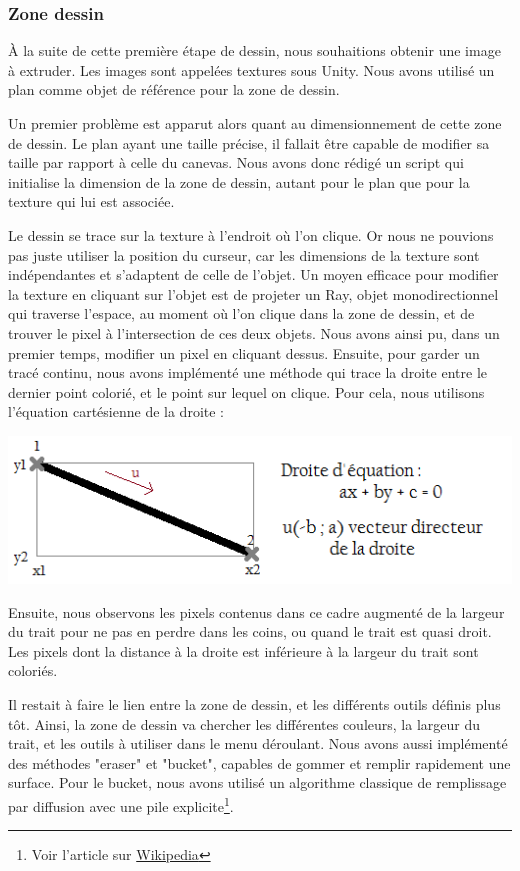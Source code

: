 \documentclass[a4paper,11pt]{article}
\begin{document}
			\subsubsection{Zone dessin} %
			À la suite de cette première étape de dessin, nous souhaitions obtenir une image à extruder. Les images sont appelées textures sous Unity. Nous avons utilisé un plan comme objet de référence pour la zone de dessin.
			
			Un premier problème est apparut alors quant au dimensionnement de cette zone de dessin. Le plan ayant une taille précise, il fallait être capable de modifier sa taille par rapport à celle du canevas. Nous avons donc rédigé un script qui initialise la dimension de la zone de dessin, autant pour le plan que pour la texture qui lui est associée.
			
			Le dessin se trace sur la texture à l'endroit où l'on clique. Or nous ne pouvions pas juste utiliser la position du curseur, car les dimensions de la texture sont indépendantes et s'adaptent de celle de l'objet. Un moyen efficace pour modifier la texture en cliquant sur l'objet est de projeter un Ray, objet monodirectionnel qui traverse l'espace, au moment où l'on clique dans la zone de dessin, et de trouver le pixel à l'intersection de ces deux objets. Nous avons ainsi pu, dans un premier temps, modifier un pixel en cliquant dessus. Ensuite, pour garder un tracé continu, nous avons implémenté une méthode qui trace la droite entre le dernier point colorié, et le point sur lequel on clique. Pour cela, nous utilisons l'équation cartésienne de la droite :
			\centerline{\includegraphics[scale=0.6]{images/trait.png}}
			Ensuite, nous observons les pixels contenus dans ce cadre augmenté de la largeur du trait pour ne pas en perdre dans les coins, ou quand le trait est quasi droit. Les pixels dont la distance à la droite est inférieure à la largeur du trait sont coloriés.
			
			 Il restait à faire le lien entre la zone de dessin, et les différents outils définis plus tôt. Ainsi, la zone de dessin va chercher les différentes couleurs, la largeur du trait, et les outils à utiliser dans le menu déroulant. Nous avons aussi implémenté des méthodes "eraser" et "bucket", capables de gommer et remplir rapidement une surface. Pour le bucket, nous avons utilisé un algorithme classique de remplissage par diffusion avec une pile explicite\footnote{Voir l'article sur \href{http://fr.wikipedia.org/wiki/Algorithme_de_remplissage_par_diffusion}{Wikipedia}}.
			
\end{document}
